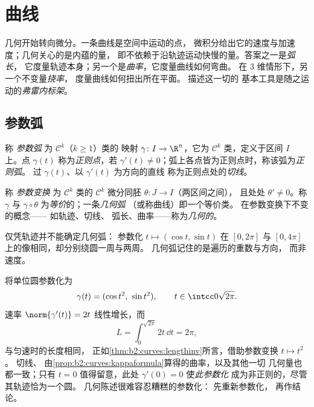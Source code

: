 \chapter{曲线}\label{ch:b2:curves}

几何开始转向微分。一条曲线是空间中运动的点，
微积分给出它的速度与加速度；几何关心的是内蕴的量，
即不依赖于沿轨迹运动快慢的量。答案之一是\emph{弧长}，
它度量轨迹本身；另一个是\emph{曲率}，它度量曲线如何弯曲。
在 $3$ 维情形下，另一个不变量\emph{挠率}，
度量曲线如何扭出所在平面。
描述这一切的
基本工具是随之运动的\emph{弗雷内标架}。

\section{参数弧}

\begin{definition}[参数弧]\label{def:b2:curves:arc}
称 \emph{参数弧} 为
$\mathcal{C}^k$（$k \geq 1$）类的
映射 $\gamma \colon I \to \R^n$，它为
$\mathcal{C}^k$ 类，定义于区间 $I$ 上。点 $\gamma(t)$ 称为\emph{正则点}，若
$\gamma'(t) \neq 0$；弧上各点皆为正则点时，称该弧为\emph{正则弧}。
过 $\gamma(t)$、以 $\gamma'(t)$ 为方向的直线
称为正则点处的\emph{切线}。
\end{definition}

\begin{definition}[参数变换]\label{def:b2:curves:reparam}
称 \emph{参数变换} 为
$\mathcal{C}^k$ 类的
$\mathcal{C}^k$ 微分同胚 $\theta \colon J \to I$（两区间之间），
且处处 $\theta' \neq 0$。称 $\gamma$ 与
$\gamma \circ \theta$ 为\emph{等价}的；一条\emph{几何弧}
（或称曲线）即一个等价类。
在参数变换下不变的概念——
如轨迹、切线、
弧长、曲率——称为\emph{几何的}。
\end{definition}

\begin{remark}
仅凭轨迹并不能确定几何弧：
参数化 $t \mapsto (\cos t, \sin t)$ 在 $[0, 2\pi]$ 与
$[0, 4\pi]$ 上的像相同，却分别绕圆一周与两周。
几何弧记住的是遍历的重数与方向，
而非速度。
\end{remark}

\begin{example}\label{ex:b2:curves:speedinvariance}
将单位圆参数化为
\[
\gamma(t) = (\cos t^2,\ \sin t^2),
\qquad t \in \intcc0{\sqrt{2\pi}} .
\]
速率 $\norm{\gamma'(t)} = 2t$ 线性增长，而
\[
L = \int_0^{\sqrt{2\pi}}2t\,\dd t = 2\pi ,
\]
与匀速时的长度相同，
正如\cref{thm:b2:curves:lengthinv}所言，借助参数变换 $t \mapsto t^2$。
切线、
由\cref{prop:b2:curves:kappaformula}算得的曲率，以及其他一切
几何量也都一致；只有 $t = 0$
值得留意，此处 $\gamma'(0) = 0$ 使\emph{此参数化}
成为非正则的，尽管其轨迹恰为一个圆。
几何陈述很难容忍糟糕的参数化：
先重新参数化，
再作结论。
\end{example}

